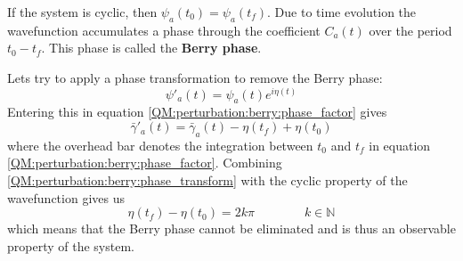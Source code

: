         \noindent If the system is cyclic, then $\psi_a(t_0) = \psi_a(t_f)$. Due to time evolution the wavefunction accumulates a phase through the coefficient $C_a(t)$ over the period $t_0-t_f$. This phase is called the \textbf{Berry phase}.
        
        Lets try to apply a phase transformation to remove the Berry phase:
        \begin{equation}
        	\label{QM:perturbation:berry:phase_transform}
        	\psi'_a(t) = \psi_a(t)e^{i\eta(t)}
        \end{equation}
        Entering this in equation \ref{QM:perturbation:berry:phase_factor} gives
        \begin{equation}
        	\bar\gamma'_a(t) = \bar\gamma_a(t) - \eta(t_f) + \eta(t_0)
        \end{equation}
        where the overhead bar denotes the integration between $t_0$ and $t_f$ in equation \ref{QM:perturbation:berry:phase_factor}. Combining \ref{QM:perturbation:berry:phase_transform} with the cyclic property of the wavefunction gives us
        \begin{equation}
        	\eta(t_f) - \eta(t_0) = 2k\pi\qquad\qquad k\in\mathbb{N}
        \end{equation}
        which means that the Berry phase cannot be eliminated and is thus an observable property of the system.
        
